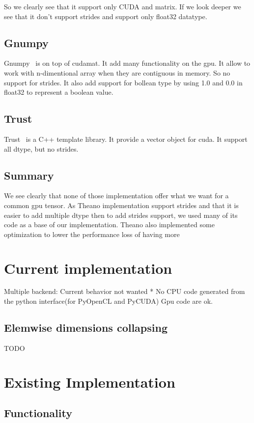 \documentclass{article} %
\begin{document}
So we clearly see that it support only CUDA and matrix. If we look deeper we see that it don't support strides and support only float32 datatype.

\subsection{Gnumpy}
Gnumpy~\citep{gnumpy-TR2010} is on top of cudamat. It add many functionality on the gpu. It allow to work with n-dimentional array when they are contiguous in memory. So no support for strides. It also add support for bollean type by using 1.0 and 0.0 in float32 to represent a boolean value.

\subsection{Trust}
Trust~\citep{Thrust} is a C++ template library. It provide a vector object for cuda. It support all dtype, but no strides.

\subsection{Summary}
We see clearly that none of those implementation offer what we want for a common gpu tensor. As Theano implementation support strides and that it is easier to add multiple dtype then to add strides support, we used many of its code as a base of our implementation. Theano also implemented some optimization to lower the performance loss of having more

\section{Current implementation}
Multiple backend:
Current behavior not wanted
    * No CPU code generated from the python interface(for PyOpenCL and PyCUDA) Gpu code are ok.

\subsection{Elemwise dimensions collapsing}
TODO

\section{Existing Implementation}

\subsection{Functionality}
\end{document}
